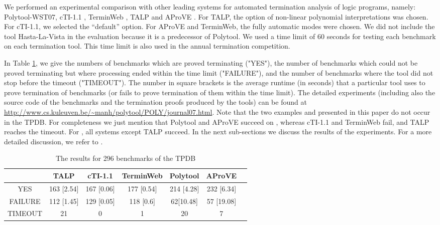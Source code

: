 \documentclass[envcountsame]{tlp}
\newcounter{ex:der-lastsymconsctr}
\begin{document}
We performed an experimental comparison with other leading systems for
automated termination analysis of logic programs,
namely: \textsf{Polytool-WST07}, \textsf{cTI-1.1} \cite{MesnardBagnara05}, \textsf{TerminWeb}
\cite{Codishetal99,terminWeb02}, \textsf{TALP} \cite{OhlebuschAAECC}
and \textsf{AProVE}
\cite{Giesletal06}. 
For \textsf{TALP}, the option of non-linear polynomial
interpretations was chosen. For \textsf{cTI-1.1}, we selected the 
``default'' option. For
\textsf{AProVE} and \textsf{TerminWeb}, the fully automatic modes were
chosen. We did not include the tool \textsf{Hasta-La-Vista}
\cite{SerebrenikandDeSchreye03} in the evaluation because it is a predecessor of
\textsf{Polytool}.
We used a time limit of 60 seconds for testing each benchmark on each
termination tool. This time limit is also used in the
annual termination
  competition.



In Table \ref{table1},
we give the numbers of benchmarks which
are proved terminating (\textsf{"YES"}), the number of benchmarks which could
not be proved terminating but where processing ended within the time limit
(\textsf{"FAILURE"}), and the number of benchmarks where the tool did not stop
before the timeout (\textsf{"TIMEOUT"}). The number in square brackets is the
average runtime (in seconds) that a particular tool uses to prove termination
of benchmarks (or fails to prove termination of them within the time
limit). The detailed experiments (including also the source code of the
benchmarks and the termination proofs 
produced by the tools) can be found at 
\url{http://www.cs.kuleuven.be/~manh/polytool/POLY/journal07.html}.
Note that the two examples  and  presented
in this paper do not occur in the TPDB. For completeness we just mention that
\textsf{Polytool} and \textsf{AProVE} succeed on , whereas
\textsf{cTI-1.1}
and
\textsf{TerminWeb} fail, and \textsf{TALP} reaches the timeout.
For , all systems  except \textsf{TALP} succeed.
In the next sub-sections we discuss the results of the experiments. For a more
detailed discussion, we refer to \cite{ThangThesis}.
\begin{table}[ht]

\begin{center}
\begin{tabular}{|c|c|c|c|c|c|c|}
\hline
     & \textsf{TALP} & \textsf{cTI-1.1} & \textsf{TerminWeb}	 &  \textsf{Polytool} & \textsf{AProVE}\\ \hline
\textsf{YES} & 163 [2.54] & 167 [0.06]      & 177 [0.54]  & 214 [4.28] & 232 [6.34]             \\ \hline
\textsf{FAILURE} & 112 [1.45] & 129 [0.05]      & 118 [0.6] & 62[10.48]    & 57 [19.08]         \\\hline
\textsf{TIMEOUT} & 21  & 0      & 1   & 20     & 7            \\\hline
\end{tabular}
\end{center}
\caption{The results for 296 benchmarks of the TPDB}
\label{table1}
\end{table}
\end{document}

